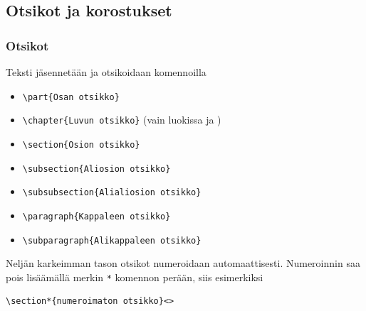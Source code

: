 \subsection{Otsikot ja korostukset}
\begin{frame}[fragile]
    \frametitle{Otsikot}
    Teksti jäsennetään ja otsikoidaan komennoilla 
    \begin{itemize}[<+->]
        \item \lstinline-\part{Osan otsikko}-
        \item \lstinline-\chapter{Luvun otsikko}- (vain luokissa  ja )
        \item \lstinline-\section{Osion otsikko}-
        \item \lstinline-\subsection{Aliosion otsikko}-
        \item \lstinline-\subsubsection{Alialiosion otsikko}-
        \item \lstinline-\paragraph{Kappaleen otsikko}-
        \item \lstinline-\subparagraph{Alikappaleen otsikko}-
    \end{itemize} \pause
    Neljän karkeimman tason otsikot numeroidaan automaattisesti. \pause Numeroinnin saa pois lisäämällä merkin \lstinline-*- komennon perään, siis esimerkiksi 
    \begin{lstlisting}
\section*{numeroimaton otsikko}<>
    \end{lstlisting}
\end{frame}

